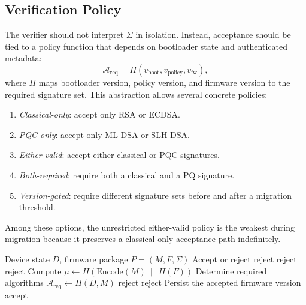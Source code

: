 \subsection{Verification Policy}

The verifier should not interpret $\Sigma$ in isolation. Instead, acceptance should be tied to a policy function that depends on bootloader state and authenticated metadata:
\begin{equation}
\mathcal{A}_{\text{req}} = \Pi(v_{\text{boot}}, v_{\text{policy}}, v_{\text{fw}}),
\label{eq:policy}
\end{equation}
where $\Pi$ maps bootloader version, policy version, and firmware version to the required signature set. This abstraction allows several concrete policies:
\begin{enumerate}
\item \textit{Classical-only}: accept only RSA or ECDSA.
\item \textit{PQC-only}: accept only ML-DSA or SLH-DSA.
\item \textit{Either-valid}: accept either classical or PQC signatures.
\item \textit{Both-required}: require both a classical and a PQ signature.
\item \textit{Version-gated}: require different signature sets before and after a migration threshold.
\end{enumerate}

Among these options, the unrestricted either-valid policy is the weakest during migration because it preserves a classical-only acceptance path indefinitely.

\begin{algorithm}[!t]
\caption{Downgrade-Resistant Firmware Verification}
\label{alg:verify}
\begin{algorithmic}[1]
\Require Device state $D$, firmware package $P=(M, F, \Sigma)$
\Ensure Accept or reject
    \State \Return reject
\EndIf
{}
    \State \Return reject
\EndIf
{}
    \State \Return reject
\EndIf
\State Compute $\mu \gets H(\text{Encode}(M)\ \|\ H(F))$
\State Determine required algorithms $\mathcal{A}_{\text{req}} \gets \Pi(D, M)$
    \State \Return reject
\EndIf
{}
        \State \Return reject
    \EndIf
\EndFor
\State Persist the accepted firmware version
\State \Return accept
\end{algorithmic}
\end{algorithm}

